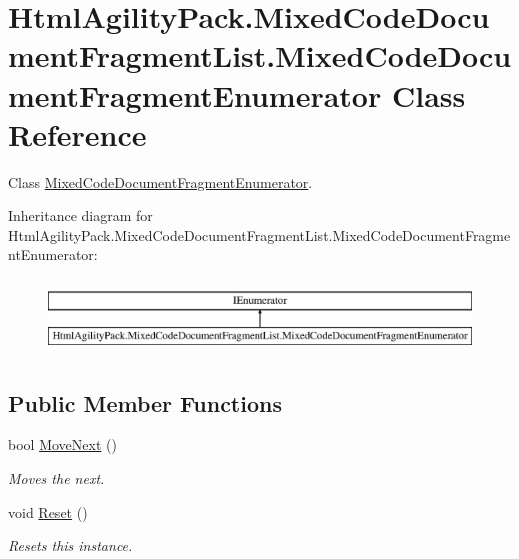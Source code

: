 \hypertarget{class_html_agility_pack_1_1_mixed_code_document_fragment_list_1_1_mixed_code_document_fragment_enumerator}{}\section{Html\+Agility\+Pack.\+Mixed\+Code\+Document\+Fragment\+List.\+Mixed\+Code\+Document\+Fragment\+Enumerator Class Reference}
\label{class_html_agility_pack_1_1_mixed_code_document_fragment_list_1_1_mixed_code_document_fragment_enumerator}


Class \hyperlink{class_html_agility_pack_1_1_mixed_code_document_fragment_list_1_1_mixed_code_document_fragment_enumerator}{Mixed\+Code\+Document\+Fragment\+Enumerator}.  


Inheritance diagram for Html\+Agility\+Pack.\+Mixed\+Code\+Document\+Fragment\+List.\+Mixed\+Code\+Document\+Fragment\+Enumerator\+:\begin{figure}[H]
\begin{center}
\leavevmode
\includegraphics[height=2.000000cm]{class_html_agility_pack_1_1_mixed_code_document_fragment_list_1_1_mixed_code_document_fragment_enumerator}
\end{center}
\end{figure}
\subsection*{Public Member Functions}
\begin{DoxyCompactItemize}
\item 
bool \hyperlink{class_html_agility_pack_1_1_mixed_code_document_fragment_list_1_1_mixed_code_document_fragment_enumerator_ad7ffaba8b471800e5f02bb057f2c9984}{Move\+Next} ()
\begin{DoxyCompactList}\small\item\em Moves the next. \end{DoxyCompactList}\item 
void \hyperlink{class_html_agility_pack_1_1_mixed_code_document_fragment_list_1_1_mixed_code_document_fragment_enumerator_a400b661bff2f0037e040fb050400047d}{Reset} ()
\begin{DoxyCompactList}\small\item\em Resets this instance. \end{DoxyCompactList}\end{DoxyCompactItemize}
